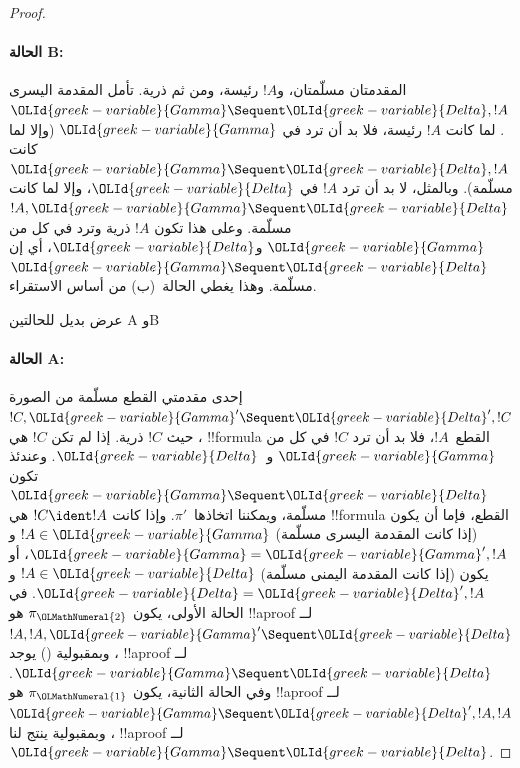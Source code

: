 \documentclass[../../../include/open-logic-section]{subfiles}
\begin{document}
\begin{proof}
\paragraph{الحالة B:} المقدمتان مسلّمتان، و$!A$ رئيسة، ومن ثم ذرية. تأمل
المقدمة اليسرى $\OLId{greek-variable}{Gamma} \Sequent \OLId{greek-variable}{Delta}, !A$. لما كانت $!A$ رئيسة، فلا بد
أن ترد في $\OLId{greek-variable}{Gamma}$ (وإلا لما كانت $\OLId{greek-variable}{Gamma} \Sequent \OLId{greek-variable}{Delta}, !A$ مسلّمة).
وبالمثل، لا بد أن ترد $!A$ في $\OLId{greek-variable}{Delta}$، وإلا لما كانت $!A, \OLId{greek-variable}{Gamma}
\Sequent \OLId{greek-variable}{Delta}$ مسلّمة. وعلى هذا تكون $!A$ ذرية وترد في كل من $\OLId{greek-variable}{Gamma}$
و$\OLId{greek-variable}{Delta}$، أي إن $\OLId{greek-variable}{Gamma} \Sequent \OLId{greek-variable}{Delta}$ مسلّمة. وهذا يغطي الحالة~(ب)
من أساس الاستقراء.

\begin{center}
عرض بديل للحالتين A وB
\end{center}

\paragraph{الحالة A:} إحدى مقدمتي القطع مسلّمة من الصورة $!C, \OLId{greek-variable}{Gamma}'
\Sequent \OLId{greek-variable}{Delta}', !C$، حيث $!C$ ذرية. إذا لم تكن $!C$ هي !!{formula}
القطع~$!A$، فلا بد أن ترد $!C$ في كل من $\OLId{greek-variable}{Gamma}$ و~$\OLId{greek-variable}{Delta}$. وعندئذ تكون
$\OLId{greek-variable}{Gamma} \Sequent \OLId{greek-variable}{Delta}$ مسلّمة، ويمكننا اتخاذها~$\pi'$. وإذا كانت
$!C\ident !A$ هي !!{formula} القطع، فإما أن يكون (إذا كانت المقدمة اليسرى
مسلّمة) $!A\in\OLId{greek-variable}{Gamma}$ و$\OLId{greek-variable}{Gamma}=\OLId{greek-variable}{Gamma}', !A$، أو يكون (إذا كانت المقدمة
اليمنى مسلّمة) $!A\in\OLId{greek-variable}{Delta}$ و$\OLId{greek-variable}{Delta}=\OLId{greek-variable}{Delta}', !A$. في الحالة الأولى،
يكون $\pi_\OLMathNumeral{2}$ هو !!a{proof} لــ$!A, !A, \OLId{greek-variable}{Gamma}' \Sequent \OLId{greek-variable}{Delta}$، وبمقبولية
\LeftR{\Contraction} () يوجد !!a{proof}
لــ$\OLId{greek-variable}{Gamma} \Sequent \OLId{greek-variable}{Delta}$. وفي الحالة الثانية، يكون $\pi_\OLMathNumeral{1}$ هو
!!a{proof} لــ$\OLId{greek-variable}{Gamma} \Sequent \OLId{greek-variable}{Delta}', !A, !A$، وبمقبولية
\RightR{\Contraction} ينتج لنا !!a{proof} لــ$\OLId{greek-variable}{Gamma} \Sequent \OLId{greek-variable}{Delta}$.


\end{proof}
\end{document}
